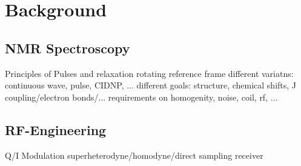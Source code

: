 \chapter{Background}
\label{ch:background}


\section{NMR Spectroscopy}
Principles of Pulses and relaxation
rotating reference frame
different variatns: continuous wave, pulse, CIDNP, ...
different goals: structure, chemical shifts, J coupling/electron bonds/...
requirements on homogenity, noise, coil, rf, ...




\section{RF-Engineering}
Q/I Modulation
superheterodyne/homodyne/direct sampling receiver